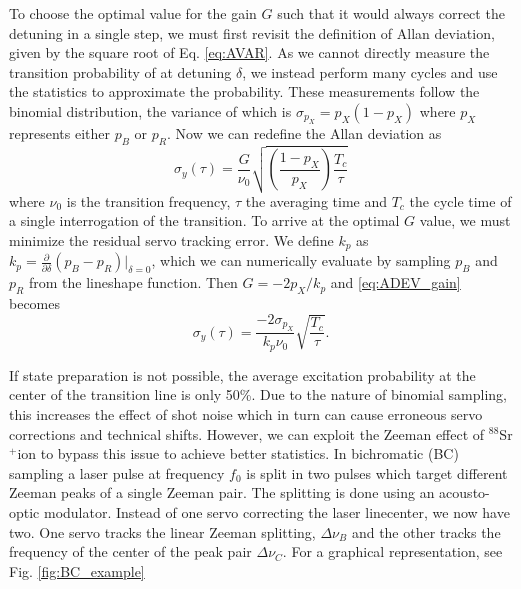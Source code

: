 \documentclass[a4paper,12pt]{article}
\newcommand{\sr}{$^{88}$Sr$^+$}
\newcommand{\pd}[2]{\frac{\partial #1}{\partial #2}}
\begin{document}
To choose the optimal value for the gain $G$ such that it would always correct
the detuning in a single step, we must first revisit the definition of Allan
deviation, given by the square root of Eq. \ref{eq:AVAR}.
As we cannot directly measure the transition probability of at detuning $\delta$,
we instead perform many cycles and use the statistics to approximate the probability.
These measurements follow the binomial distribution, the variance of which is
$\sigma_{p_X} = p_X(1-p_X)$ where $p_X$ represents either $p_B$ or $p_R$.
Now we can redefine the Allan deviation as
\begin{equation}
  \sigma_y(\tau) = \frac{G}{\nu_0} \sqrt{\left(\frac{1-p_X}{p_X}\right) \frac{T_c}{\tau}}
  \label{eq:ADEV_gain}
\end{equation}
where $\nu_0$ is the transition frequency, $\tau$ the averaging time and $T_c$ the
cycle time of a single interrogation of the transition.
To arrive at the optimal $G$ value, we must minimize the residual servo tracking error.
We define $k_p$ as $k_p = \pd{}{\delta} (p_B - p_R) |_{\delta=0}$, which we can numerically
evaluate by sampling $p_B$ and $p_R$ from the lineshape function.
Then $G= -2p_X/k_p$ and \eqref{eq:ADEV_gain} becomes
\begin{equation}
  \sigma_y(\tau) = \frac{-2 \sigma_{p_X}}{k_p \nu_0} \sqrt{\frac{T_c}{\tau}} \textrm{.}
\end{equation}

If state preparation is not possible, the average excitation probability at
the center of the transition line is only 50\%.
Due to the nature of binomial sampling, this increases the effect of shot noise
which in turn can cause erroneous servo corrections and technical shifts.
However, we can exploit the Zeeman effect of \sr ion to bypass this issue to 
achieve better statistics.
In bichromatic (BC) sampling a laser pulse at frequency $f_0$ is split in two
pulses which target different Zeeman peaks of a single Zeeman pair.
The splitting is done using an acousto-optic modulator.
Instead of one servo correcting the laser linecenter, we now have two.
One servo tracks the linear Zeeman splitting, $\Delta \nu_B$ and the other
tracks the frequency of the center of the peak pair $\Delta \nu_C$.
For a graphical representation, see Fig. \ref{fig:BC_example}
\end{document}

